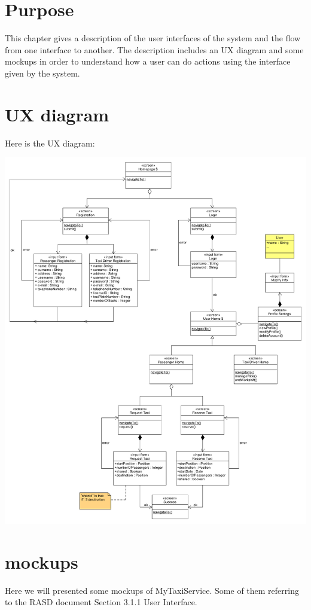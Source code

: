 \section{Purpose}

This chapter gives a description of the user interfaces of the system and the flow from one interface to another. The description includes an UX diagram and some mockups in order to understand how a user can do actions using the interface given by the system.

\section{UX diagram}
Here is the UX diagram:
	\begin{center}
		\includegraphics[height=\textheight]{diagrams/UX.jpg}
	\end{center}

\section{mockups}
Here we will presented some mockups of MyTaxiService. Some of them referring to the RASD document Section 3.1.1 User Interface.

